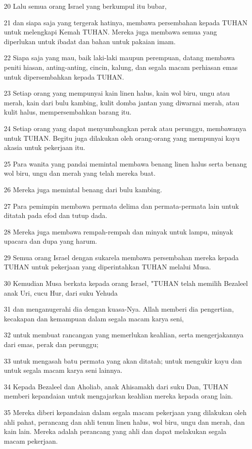 \par 20 Lalu semua orang Israel yang berkumpul itu bubar,
\par 21 dan siapa saja yang tergerak hatinya, membawa persembahan kepada TUHAN untuk melengkapi Kemah TUHAN. Mereka juga membawa semua yang diperlukan untuk ibadat dan bahan untuk pakaian imam.
\par 22 Siapa saja yang mau, baik laki-laki maupun perempuan, datang membawa peniti hiasan, anting-anting, cincin, kalung, dan segala macam perhiasan emas untuk dipersembahkan kepada TUHAN.
\par 23 Setiap orang yang mempunyai kain linen halus, kain wol biru, ungu atau merah, kain dari bulu kambing, kulit domba jantan yang diwarnai merah, atau kulit halus, mempersembahkan barang itu.
\par 24 Setiap orang yang dapat menyumbangkan perak atau perunggu, membawanya untuk TUHAN. Begitu juga dilakukan oleh orang-orang yang mempunyai kayu akasia untuk pekerjaan itu.
\par 25 Para wanita yang pandai memintal membawa benang linen halus serta benang wol biru, ungu dan merah yang telah mereka buat.
\par 26 Mereka juga memintal benang dari bulu kambing.
\par 27 Para pemimpin membawa permata delima dan permata-permata lain untuk ditatah pada efod dan tutup dada.
\par 28 Mereka juga membawa rempah-rempah dan minyak untuk lampu, minyak upacara dan dupa yang harum.
\par 29 Semua orang Israel dengan sukarela membawa persembahan mereka kepada TUHAN untuk pekerjaan yang diperintahkan TUHAN melalui Musa.
\par 30 Kemudian Musa berkata kepada orang Israel, "TUHAN telah memilih Bezaleel anak Uri, cucu Hur, dari suku Yehuda
\par 31 dan menganugerahi dia dengan kuasa-Nya. Allah memberi dia pengertian, kecakapan dan kemampuan dalam segala macam karya seni,
\par 32 untuk membuat rancangan yang memerlukan keahlian, serta mengerjakannya dari emas, perak dan perunggu;
\par 33 untuk mengasah batu permata yang akan ditatah; untuk mengukir kayu dan untuk segala macam karya seni lainnya.
\par 34 Kepada Bezaleel dan Aholiab, anak Ahisamakh dari suku Dan, TUHAN memberi kepandaian untuk mengajarkan keahlian mereka kepada orang lain.
\par 35 Mereka diberi kepandaian dalam segala macam pekerjaan yang dilakukan oleh ahli pahat, perancang dan ahli tenun linen halus, wol biru, ungu dan merah, dan kain lain. Mereka adalah perancang yang ahli dan dapat melakukan segala macam pekerjaan.

